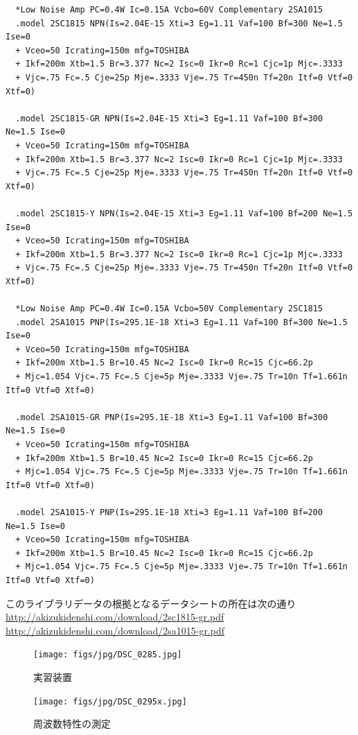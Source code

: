 \documentclass[uplatex,a4paper,11pt,oneside,openany]{jsbook}
\begin{document}
\begin{verbatim}
  *Low Noise Amp PC=0.4W Ic=0.15A Vcbo=60V Complementary 2SA1015
  .model 2SC1815 NPN(Is=2.04E-15 Xti=3 Eg=1.11 Vaf=100 Bf=300 Ne=1.5 Ise=0
  + Vceo=50 Icrating=150m mfg=TOSHIBA
  + Ikf=200m Xtb=1.5 Br=3.377 Nc=2 Isc=0 Ikr=0 Rc=1 Cjc=1p Mjc=.3333
  + Vjc=.75 Fc=.5 Cje=25p Mje=.3333 Vje=.75 Tr=450n Tf=20n Itf=0 Vtf=0 Xtf=0)
  
  .model 2SC1815-GR NPN(Is=2.04E-15 Xti=3 Eg=1.11 Vaf=100 Bf=300 Ne=1.5 Ise=0
  + Vceo=50 Icrating=150m mfg=TOSHIBA
  + Ikf=200m Xtb=1.5 Br=3.377 Nc=2 Isc=0 Ikr=0 Rc=1 Cjc=1p Mjc=.3333
  + Vjc=.75 Fc=.5 Cje=25p Mje=.3333 Vje=.75 Tr=450n Tf=20n Itf=0 Vtf=0 Xtf=0)
  
  .model 2SC1815-Y NPN(Is=2.04E-15 Xti=3 Eg=1.11 Vaf=100 Bf=200 Ne=1.5 Ise=0
  + Vceo=50 Icrating=150m mfg=TOSHIBA
  + Ikf=200m Xtb=1.5 Br=3.377 Nc=2 Isc=0 Ikr=0 Rc=1 Cjc=1p Mjc=.3333
  + Vjc=.75 Fc=.5 Cje=25p Mje=.3333 Vje=.75 Tr=450n Tf=20n Itf=0 Vtf=0 Xtf=0)
  
  *Low Noise Amp PC=0.4W Ic=0.15A Vcbo=50V Complementary 2SC1815
  .model 2SA1015 PNP(Is=295.1E-18 Xti=3 Eg=1.11 Vaf=100 Bf=300 Ne=1.5 Ise=0
  + Vceo=50 Icrating=150m mfg=TOSHIBA
  + Ikf=200m Xtb=1.5 Br=10.45 Nc=2 Isc=0 Ikr=0 Rc=15 Cjc=66.2p
  + Mjc=1.054 Vjc=.75 Fc=.5 Cje=5p Mje=.3333 Vje=.75 Tr=10n Tf=1.661n Itf=0 Vtf=0 Xtf=0)
  
  .model 2SA1015-GR PNP(Is=295.1E-18 Xti=3 Eg=1.11 Vaf=100 Bf=300 Ne=1.5 Ise=0
  + Vceo=50 Icrating=150m mfg=TOSHIBA
  + Ikf=200m Xtb=1.5 Br=10.45 Nc=2 Isc=0 Ikr=0 Rc=15 Cjc=66.2p
  + Mjc=1.054 Vjc=.75 Fc=.5 Cje=5p Mje=.3333 Vje=.75 Tr=10n Tf=1.661n Itf=0 Vtf=0 Xtf=0)
  
  .model 2SA1015-Y PNP(Is=295.1E-18 Xti=3 Eg=1.11 Vaf=100 Bf=200 Ne=1.5 Ise=0
  + Vceo=50 Icrating=150m mfg=TOSHIBA
  + Ikf=200m Xtb=1.5 Br=10.45 Nc=2 Isc=0 Ikr=0 Rc=15 Cjc=66.2p
  + Mjc=1.054 Vjc=.75 Fc=.5 Cje=5p Mje=.3333 Vje=.75 Tr=10n Tf=1.661n Itf=0 Vtf=0 Xtf=0)  
\end{verbatim}

このライブラリデータの根拠となるデータシートの所在は次の通り\\
\url{http://akizukidenshi.com/download/2sc1815-gr.pdf}\\
\url{http://akizukidenshi.com/download/2sa1015-gr.pdf}\\

\begin{spacing}{0.2}
  \begin{figure}[H]
    \centering
     \texttt{[image: figs/jpg/DSC\_0285.jpg]}
                 \caption{実習装置}
                 \label{fig:pic1}
 \end{figure}

 \begin{figure}[H]
    \centering
     \texttt{[image: figs/jpg/DSC\_0295x.jpg]}
               \caption{周波数特性の測定}
               \label{fig:pic2}
 \end{figure}
\end{spacing}
\end{document}
